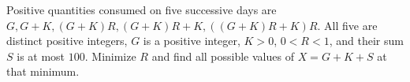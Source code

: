 Positive quantities consumed on five successive days are $G,G+K,(G+K)R,(G+K)R+K,((G+K)R+K)R$. All five are distinct positive integers, $G$ is a positive integer, $K>0$, $0<R<1$, and their sum $S$ is at most $100$. Minimize $R$ and find all possible values of $X=G+K+S$ at that minimum.
